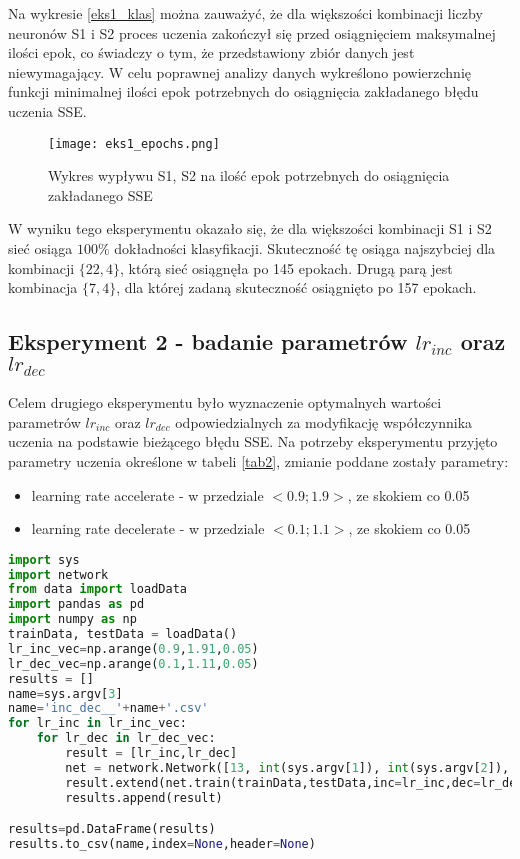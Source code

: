 \documentclass[12pt,twoside]{article}
\begin{document}
Na wykresie \ref{eks1_klas} można zauważyć, że dla większości kombinacji liczby neuronów S1 i S2 proces uczenia zakończył się przed osiągnięciem maksymalnej ilości epok, co świadczy o tym, że przedstawiony zbiór danych jest niewymagający. W celu poprawnej analizy danych wykreślono powierzchnię funkcji minimalnej ilości epok potrzebnych do osiągnięcia zakładanego błędu uczenia SSE.
\clearpage
\begin{figure}[H]
\label{eks1_epochs}
\centering
\texttt{[image: eks1\_epochs.png]}
\caption{Wykres wypływu S1, S2 na ilość epok potrzebnych do osiągnięcia zakładanego SSE}
\end{figure}

W wyniku tego eksperymentu okazało się, że dla większości kombinacji S1 i S2 sieć osiąga $100\%$ dokładności klasyfikacji. Skuteczność tę osiąga najszybciej dla kombinacji $\{22,4\}$, którą sieć osiągnęła po 145 epokach. Drugą parą jest kombinacja $\{7,4\}$, dla której zadaną skuteczność osiągnięto po 157 epokach.



\subsection{Eksperyment 2 - badanie parametrów $lr_{inc}$ oraz $lr_{dec}$}
Celem drugiego eksperymentu było wyznaczenie optymalnych wartości parametrów $lr_{inc}$ oraz $lr_{dec}$ odpowiedzialnych za modyfikację współczynnika uczenia na podstawie bieżącego błędu SSE. Na potrzeby eksperymentu przyjęto parametry uczenia określone w tabeli \ref{tab2}, zmianie poddane zostały parametry:
\begin{itemize}
\item learning rate accelerate - w przedziale $< 0.9; 1.9 >$, ze skokiem co 0.05
\item learning rate decelerate - w przedziale $< 0.1; 1.1 >$, ze skokiem co 0.05
\end{itemize}


\begin{lstlisting}[language=Python,caption=Algorytm realizujący eksperyment 2,label={eks2}]
import sys
import network
from data import loadData
import pandas as pd
import numpy as np
trainData, testData = loadData()
lr_inc_vec=np.arange(0.9,1.91,0.05)
lr_dec_vec=np.arange(0.1,1.11,0.05)
results = []
name=sys.argv[3]
name='inc_dec__'+name+'.csv'
for lr_inc in lr_inc_vec:
	for lr_dec in lr_dec_vec:
		result = [lr_inc,lr_dec]
		net = network.Network([13, int(sys.argv[1]), int(sys.argv[2]), 3])
		result.extend(net.train(trainData,testData,inc=lr_inc,dec=lr_dec))
		results.append(result)

results=pd.DataFrame(results)
results.to_csv(name,index=None,header=None)


\end{lstlisting}
\end{document}
